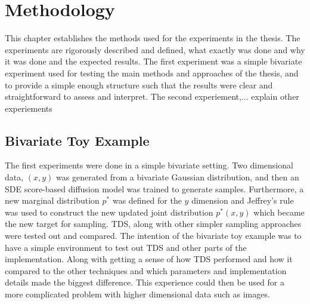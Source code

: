 \chapter{Methodology}
\label{ch:methodology}
This chapter establishes the methods used for the experiments in the thesis. The experiments are rigorously described and defined, what exactly was done and why it was done and the expected results. The first experiment was a simple bivariate experiment used for testing the main methods and approaches of the thesis, and to provide a simple enough structure such that the results were clear and straightforward to assess and interpret. The second experiement,... explain other experiements
\section{Bivariate Toy Example}
The first experiments were done in a simple bivariate setting. Two dimensional data, $(x,y)$ was generated from a bivariate Gaussian distribution, and then an SDE score-based diffusion model was trained to generate samples. Furthermore, a new marginal distribution $p^*$ was defined for the $y$ dimension and Jeffrey's rule was used to construct the new updated joint distribution $p^*(x,y)$ which became the new target for sampling. TDS, along with other simpler sampling approaches were tested out and compared. The intention of the bivariate toy example was to have a simple environment to test out TDS and other parts of the implementation. Along with getting a sense of how TDS performed and how it compared to the other techniques and which parameters and implementation details made the biggest difference. This experience could then be used for a more complicated problem with higher dimensional data such as images.

